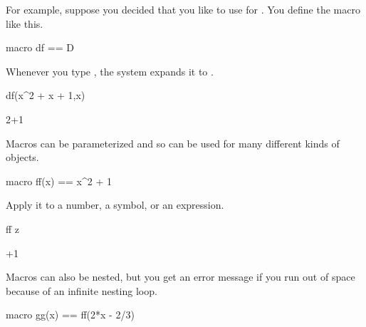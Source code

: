 %
\begin{xtc}
\begin{xtccomment}
For example, suppose you decided that you
like to use  for .
You define the macro  like this.
\end{xtccomment}
\begin{spadsrc}
macro df == D 
\end{spadsrc}
\end{xtc}
\begin{xtc}
\begin{xtccomment}
Whenever you type , the system expands it to
.
\end{xtccomment}
\begin{spadsrc}
df(x^2 + x + 1,x) 
\end{spadsrc}
\begin{TeXOutput}
\begin{fricasmath}{2}
2\TIMES {}+1%
\end{fricasmath}
\end{TeXOutput}
\end{xtc}
\begin{xtc}
\begin{xtccomment}
Macros can be parameterized and so can be used for many different
kinds of objects.
\end{xtccomment}
\begin{spadsrc}
macro ff(x) == x^2 + 1 
\end{spadsrc}
\end{xtc}
\begin{xtc}
\begin{xtccomment}
Apply it to a number, a symbol, or an expression.
\end{xtccomment}
\begin{spadsrc}
ff z 
\end{spadsrc}
\begin{TeXOutput}
\begin{fricasmath}{4}
+1%
\end{fricasmath}
\end{TeXOutput}
\end{xtc}
\begin{xtc}
\begin{xtccomment}
Macros can also be nested, but you get an error message if you
run out of space because of an infinite nesting loop.
\end{xtccomment}
\begin{spadsrc}
macro gg(x) == ff(2*x - 2/3) 
\end{spadsrc}
\end{xtc}
